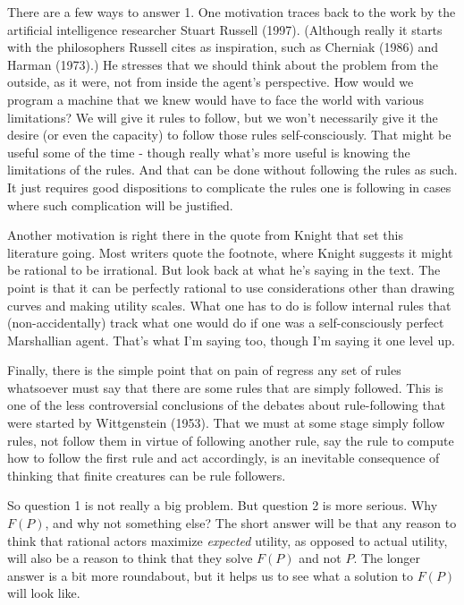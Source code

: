 \documentclass[
  12pt,
]{article}
\begin{document}
There are a few ways to answer 1. One motivation traces back to the work by the artificial intelligence researcher Stuart Russell (1997). (Although really it starts with the philosophers Russell cites as inspiration, such as Cherniak (1986) and Harman (1973).) He stresses that we should think about the problem from the outside, as it were, not from inside the agent's perspective. How would we program a machine that we knew would have to face the world with various limitations? We will give it rules to follow, but we won't necessarily give it the desire (or even the capacity) to follow those rules self-consciously. That might be useful some of the time - though really what's more useful is knowing the limitations of the rules. And that can be done without following the rules as such. It just requires good dispositions to complicate the rules one is following in cases where such complication will be justified.

Another motivation is right there in the quote from Knight that set this literature going. Most writers quote the footnote, where Knight suggests it might be rational to be irrational. But look back at what he's saying in the text. The point is that it can be perfectly rational to use considerations other than drawing curves and making utility scales. What one has to do is follow internal rules that (non-accidentally) track what one would do if one was a self-consciously perfect Marshallian agent. That's what I'm saying too, though I'm saying it one level up.

Finally, there is the simple point that on pain of regress any set of rules whatsoever must say that there are some rules that are simply followed. This is one of the less controversial conclusions of the debates about rule-following that were started by Wittgenstein (1953). That we must at some stage simply follow rules, not follow them in virtue of following another rule, say the rule to compute how to follow the first rule and act accordingly, is an inevitable consequence of thinking that finite creatures can be rule followers.

So question 1 is not really a big problem. But question 2 is more serious. Why \(F(P)\), and why not something else? The short answer will be that any reason to think that rational actors maximize \emph{expected} utility, as opposed to actual utility, will also be a reason to think that they solve \(F(P)\) and not \(P\). The longer answer is a bit more roundabout, but it helps us to see what a solution to \(F(P)\) will look like.
\end{document}

